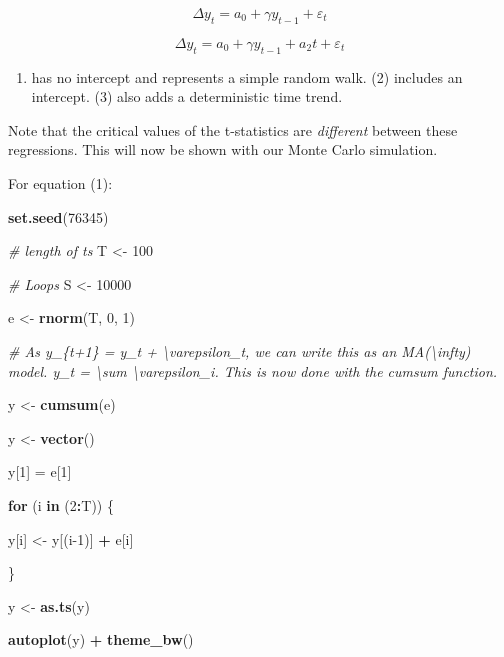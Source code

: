 \documentclass[11pt, a4paper]{report}
\newenvironment{Shaded}{\begin{snugshade}}{\end{snugshade}}
\newcommand{\CommentTok}[1]{\textcolor[rgb]{0.56,0.35,0.01}{\textit{#1}}}
\newcommand{\ControlFlowTok}[1]{\textcolor[rgb]{0.13,0.29,0.53}{\textbf{#1}}}
\newcommand{\DecValTok}[1]{\textcolor[rgb]{0.00,0.00,0.81}{#1}}
\newcommand{\KeywordTok}[1]{\textcolor[rgb]{0.13,0.29,0.53}{\textbf{#1}}}
\newcommand{\NormalTok}[1]{#1}
\newcommand{\OperatorTok}[1]{\textcolor[rgb]{0.81,0.36,0.00}{\textbf{#1}}}
\newcommand{\StringTok}[1]{\textcolor[rgb]{0.31,0.60,0.02}{#1}}
\providecommand{\tightlist}{%
	\setlength{\itemsep}{0pt}\setlength{\parskip}{0pt}}
\theoremstyle{plain}
\theoremstyle{plain}
\theoremstyle{remark}
\begin{document}
\begin{equation}
\Delta y_t = a_0 + \gamma y_{t-1} + \varepsilon_t
\end{equation}

\begin{equation}
\Delta y_t = a_0 + \gamma y_{t-1} + a_2t + \varepsilon_t
\end{equation}

\begin{enumerate}
\def\labelenumi{(\arabic{enumi})}
\tightlist
\item
  has no intercept and represents a simple random walk. (2) includes an
  intercept. (3) also adds a deterministic time trend.
\end{enumerate}

Note that the critical values of the t-statistics are \emph{different}
between these regressions. This will now be shown with our Monte Carlo
simulation.

For equation (1):

\begin{Shaded}
\begin{Highlighting}[]
\KeywordTok{set.seed}\NormalTok{(}\DecValTok{76345}\NormalTok{)}

\CommentTok{# length of ts}
\NormalTok{T <-}\StringTok{ }\DecValTok{100}

\CommentTok{# Loops}
\NormalTok{S <-}\StringTok{ }\DecValTok{10000}

\NormalTok{e <-}\StringTok{ }\KeywordTok{rnorm}\NormalTok{(T, }\DecValTok{0}\NormalTok{, }\DecValTok{1}\NormalTok{)}

\CommentTok{# As y_\{t+1\} = y_t + \textbackslash{}varepsilon_t, we can write this as an MA(\textbackslash{}infty) model. y_t = \textbackslash{}sum \textbackslash{}varepsilon_i. This is now done with the cumsum function.}

\NormalTok{y <-}\StringTok{ }\KeywordTok{cumsum}\NormalTok{(e)}

\NormalTok{y <-}\StringTok{ }\KeywordTok{vector}\NormalTok{()}

\NormalTok{y[}\DecValTok{1}\NormalTok{] =}\StringTok{ }\NormalTok{e[}\DecValTok{1}\NormalTok{]}

\ControlFlowTok{for}\NormalTok{ (i }\ControlFlowTok{in}\NormalTok{ (}\DecValTok{2}\OperatorTok{:}\NormalTok{T)) \{}

\NormalTok{    y[i] <-}\StringTok{ }\NormalTok{y[(i}\DecValTok{-1}\NormalTok{)] }\OperatorTok{+}\StringTok{ }\NormalTok{e[i]}

\NormalTok{\}}

\NormalTok{y <-}\StringTok{ }\KeywordTok{as.ts}\NormalTok{(y)}

\KeywordTok{autoplot}\NormalTok{(y) }\OperatorTok{+}\StringTok{ }\KeywordTok{theme_bw}\NormalTok{()}
\end{Highlighting}
\end{Shaded}
\end{document}
